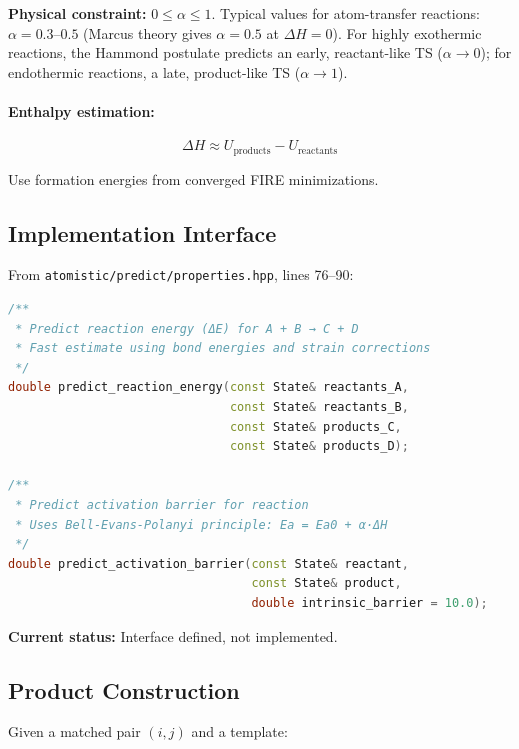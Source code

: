 \documentclass[11pt]{article}
\begin{document}
\textbf{Physical constraint:} $0 \leq \alpha \leq 1$. Typical values for atom-transfer reactions: $\alpha = 0.3$--$0.5$ (Marcus theory gives $\alpha = 0.5$ at $\Delta H = 0$). For highly exothermic reactions, the Hammond postulate predicts an early, reactant-like TS ($\alpha \to 0$); for endothermic reactions, a late, product-like TS ($\alpha \to 1$).

\paragraph{Enthalpy estimation:}
\begin{equation}
\Delta H \approx U_{\text{products}} - U_{\text{reactants}}
\end{equation}

Use formation energies from converged FIRE minimizations.

\subsection{Implementation Interface}

From \texttt{atomistic/predict/properties.hpp}, lines 76--90:

\begin{lstlisting}[language=C++]
/**
 * Predict reaction energy (ΔE) for A + B → C + D
 * Fast estimate using bond energies and strain corrections
 */
double predict_reaction_energy(const State& reactants_A,
                               const State& reactants_B,
                               const State& products_C,
                               const State& products_D);

/**
 * Predict activation barrier for reaction
 * Uses Bell-Evans-Polanyi principle: Ea = Ea0 + α·ΔH
 */
double predict_activation_barrier(const State& reactant,
                                  const State& product,
                                  double intrinsic_barrier = 10.0);
\end{lstlisting}

\textbf{Current status:} Interface defined, not implemented.

\subsection{Product Construction}

Given a matched pair $(i, j)$ and a template:
\end{document}
